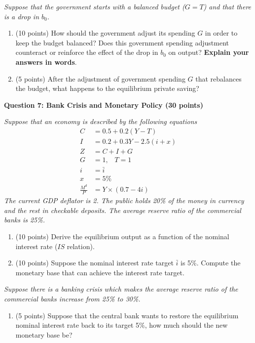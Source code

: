\documentclass[12pt]{article}
\begin{document}
\textit{Suppose that the government starts with a balanced budget ($G=T$) and that there is a drop in $b_0$.}

\begin{enumerate}[label=\alph*., resume]
    \item (10 points) How should the government adjust its spending $G$ in order to keep the budget balanced? Does this government spending adjustment counteract or reinforce the effect of the drop in $b_0$ on output? \textbf{Explain your answers in words}.
    \item (5 points) After the adjustment of government spending $G$ that rebalances the budget, what happens to the equilibrium private saving?
\end{enumerate}

\newpage
\textbf{Question 7: Bank Crisis and Monetary Policy (30 points)}

\textit{Suppose that an economy is described by the following equations}
\begin{align*}
    C &= 0.5 + 0.2(Y-T) \\
    I &= 0.2 + 0.3Y -2.5(i+x) \\
    Z &= C + I + G\\
    G &= 1,\,\,\,\,\, T = 1\\
    i &= \bar{i}\\
    x &= 5\%\\
    \frac{M^d}{P} &= Y \times (0.7 - 4i)
\end{align*}
\textit{The current GDP deflator is 2. The public holds 20\% of the money in currency and the rest in checkable deposits. The average reserve ratio of the commercial banks is 25\%. }
\begin{enumerate}[label=\alph*.]
    \item (10 points) Derive the equilibrium output as a function of the nominal interest rate ($IS$ relation).

	\item (10 points) Suppose the nominal interest rate target $\bar{i}$ is 5\%. Compute the monetary base that can achieve the interest rate target. 
\end{enumerate}

\textit{Suppose there is a banking crisis which makes the average reserve ratio of the commercial banks increase from 25\% to 30\%. }
\begin{enumerate}[label=\alph*., resume]
    \item (5 points) Suppose that the central bank wants to restore the equilibrium nominal interest rate back to its target 5\%, how much should the new monetary base be?
\end{enumerate}
\end{document}
